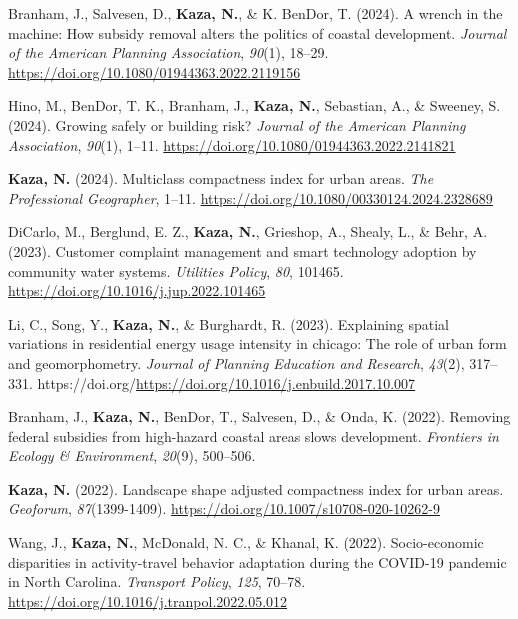 \documentclass[11pt,a4paper,]{awesome-cv}
\newlength{\cslhangindent}
\newenvironment{CSLReferences}[2] %
 {\begin{list}{}{%
  \setlength{\itemindent}{0pt}
  \setlength{\leftmargin}{0pt}
  \setlength{\parsep}{0pt}
  \ifodd #1
   \setlength{\leftmargin}{\cslhangindent}
   \setlength{\itemindent}{-1\cslhangindent}
  \fi
  \setlength{\itemsep}{#2\baselineskip}}}
 {\end{list}}
\begin{document}
\label{refs-7ca7bb3515092132dab0d274f5eaaf31}
\begin{CSLReferences}{1}{0}
Branham, J., Salvesen, D., \textbf{Kaza, N.}, \& K. BenDor, T. (2024). A
wrench in the machine: How subsidy removal alters the politics of
coastal development. \emph{Journal of the American Planning
Association}, \emph{90}(1), 18--29.
\url{https://doi.org/10.1080/01944363.2022.2119156}

Hino, M., BenDor, T. K., Branham, J., \textbf{Kaza, N.}, Sebastian, A.,
\& Sweeney, S. (2024). Growing safely or building risk? \emph{Journal of
the American Planning Association}, \emph{90}(1), 1--11.
\url{https://doi.org/10.1080/01944363.2022.2141821}

\textbf{Kaza, N.} (2024). Multiclass compactness index for urban areas.
\emph{The Professional Geographer}, 1--11.
\url{https://doi.org/10.1080/00330124.2024.2328689}

DiCarlo, M., Berglund, E. Z., \textbf{Kaza, N.}, Grieshop, A., Shealy,
L., \& Behr, A. (2023). Customer complaint management and smart
technology adoption by community water systems. \emph{Utilities Policy},
\emph{80}, 101465. \url{https://doi.org/10.1016/j.jup.2022.101465}

Li, C., Song, Y., \textbf{Kaza, N.}, \& Burghardt, R. (2023). Explaining
spatial variations in residential energy usage intensity in chicago: The
role of urban form and geomorphometry. \emph{Journal of Planning
Education and Research}, \emph{43}(2), 317--331.
https://doi.org/\url{https://doi.org/10.1016/j.enbuild.2017.10.007}

Branham, J., \textbf{Kaza, N.}, BenDor, T., Salvesen, D., \& Onda, K.
(2022). Removing federal subsidies from high-hazard coastal areas slows
development. \emph{Frontiers in Ecology \& Environment}, \emph{20}(9),
500--506.

\textbf{Kaza, N.} (2022). Landscape shape adjusted compactness index for
urban areas. \emph{Geoforum}, \emph{87}(1399-1409).
\url{https://doi.org/10.1007/s10708-020-10262-9}

Wang, J., \textbf{Kaza, N.}, McDonald, N. C., \& Khanal, K. (2022).
Socio-economic disparities in activity-travel behavior adaptation during
the COVID-19 pandemic in North Carolina. \emph{Transport Policy},
\emph{125}, 70--78. \url{https://doi.org/10.1016/j.tranpol.2022.05.012}


\end{CSLReferences}
\end{document}
